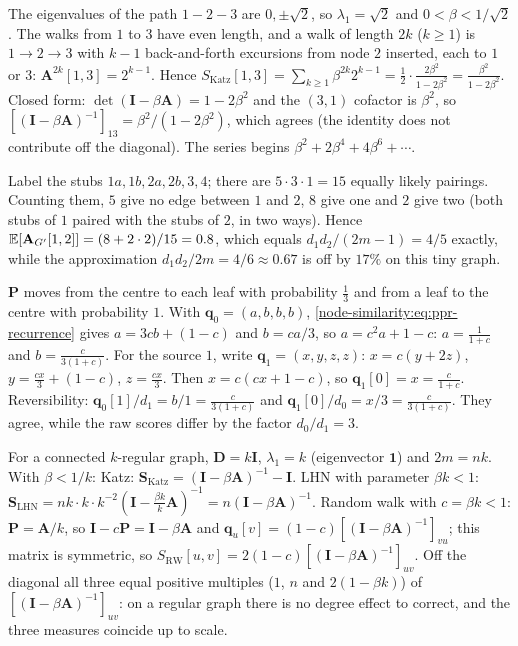 The eigenvalues of the path $1 - 2 - 3$ are $0, \pm\sqrt2$, so $\lambda_1 = \sqrt2$ and $0 < \beta < 1/\sqrt2$. The walks from $1$ to $3$ have even length, and a walk of length $2k$ ($k \ge 1$) is $1\to2\to3$ with $k-1$ back-and-forth excursions from node $2$ inserted, each to $1$ or $3$: $\mathbf A^{2k}[1,3] = 2^{k-1}$. Hence
$S_{\text{Katz}}[1,3] = \sum_{k\ge1}\beta^{2k}2^{k-1} = \frac12\cdot\frac{2\beta^2}{1-2\beta^2} = \frac{\beta^2}{1-2\beta^2}$.
Closed form: $\det(\mathbf I - \beta\mathbf A) = 1 - 2\beta^2$ and the $(3,1)$ cofactor is $\beta^2$, so $[(\mathbf I - \beta\mathbf A)^{-1}]_{13} = \beta^2/(1-2\beta^2)$, which agrees (the identity does not contribute off the diagonal). The series begins $\beta^2 + 2\beta^4 + 4\beta^6 + \cdots$.

Label the stubs $1a, 1b, 2a, 2b, 3, 4$; there are $5\cdot3\cdot1 = 15$ equally likely pairings. Counting them, $5$ give no edge between $1$ and $2$, $8$ give one and $2$ give two (both stubs of $1$ paired with the stubs of $2$, in two ways). Hence $\mathbb{E}[\mathbf A_{G'}[1,2]] = (8 + 2\cdot2)/15 = 0.8$, which equals $d_1d_2/(2m-1) = 4/5$ exactly, while the approximation $d_1d_2/2m = 4/6 \approx 0.67$ is off by $17\%$ on this tiny graph.

$\mathbf P$ moves from the centre to each leaf with probability $\frac13$ and from a leaf to the centre with probability $1$. With $\mathbf q_0 = (a, b, b, b)$, \eqref{node-similarity:eq:ppr-recurrence} gives $a = 3cb + (1-c)$ and $b = ca/3$, so $a = c^2a + 1 - c$: $a = \frac{1}{1+c}$ and $b = \frac{c}{3(1+c)}$.
For the source $1$, write $\mathbf q_1 = (x, y, z, z)$: $x = c(y + 2z)$, $y = \frac{cx}3 + (1-c)$, $z = \frac{cx}3$. Then $x = c(cx + 1 - c)$, so $\mathbf q_1[0] = x = \frac{c}{1+c}$.
Reversibility: $\mathbf q_0[1]/d_1 = b/1 = \frac{c}{3(1+c)}$ and $\mathbf q_1[0]/d_0 = x/3 = \frac{c}{3(1+c)}$. They agree, while the raw scores differ by the factor $d_0/d_1 = 3$.

For a connected $k$-regular graph, $\mathbf D = k\mathbf I$, $\lambda_1 = k$ (eigenvector $\mathbf 1$) and $2m = nk$. With $\beta < 1/k$:
Katz: $\mathbf S_{\text{Katz}} = (\mathbf I - \beta\mathbf A)^{-1} - \mathbf I$.
LHN with parameter $\beta k < 1$: $\mathbf S_{\text{LHN}} = nk\cdot k\cdot k^{-2}(\mathbf I - \frac{\beta k}{k}\mathbf A)^{-1} = n(\mathbf I - \beta\mathbf A)^{-1}$.
Random walk with $c = \beta k < 1$: $\mathbf P = \mathbf A/k$, so $\mathbf I - c\mathbf P = \mathbf I - \beta\mathbf A$ and $\mathbf q_u[v] = (1-c)[(\mathbf I - \beta\mathbf A)^{-1}]_{vu}$; this matrix is symmetric, so $S_{\text{RW}}[u,v] = 2(1-c)[(\mathbf I - \beta\mathbf A)^{-1}]_{uv}$.
Off the diagonal all three equal positive multiples ($1$, $n$ and $2(1-\beta k)$) of $[(\mathbf I - \beta\mathbf A)^{-1}]_{uv}$: on a regular graph there is no degree effect to correct, and the three measures coincide up to scale.

